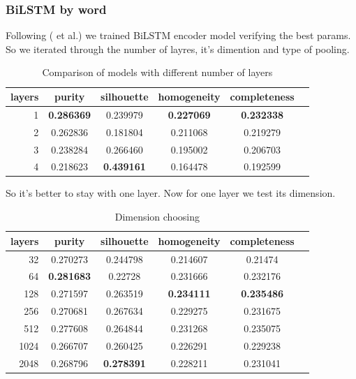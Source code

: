 \documentclass[11pt]{article}
\begin{document}
\subsubsection{BiLSTM by word}

Following ( et al.) we trained BiLSTM encoder model verifying the best params. So we iterated through the number of layres, it's dimention and type of pooling.

\begin{table}[htb]
\begin{center}
\begin{tabular}{ |r|c|c|c|c|c| }
\hline
layers & purity  & silhouette  & homogeneity  & completeness \\ \hline 
1  & \textbf{0.286369}  & 0.239979  & \textbf{0.227069}  & \textbf{0.232338}\\ \hline 
2  & 0.262836  & 0.181804  & 0.211068  & 0.219279\\ \hline 
3  & 0.238284  & 0.266460  & 0.195002  & 0.206703\\ \hline 
4  & 0.218623  & \textbf{0.439161}  & 0.164478  & 0.192599
\end{tabular}
\end{center}
\caption{Comparison of models with different number of layers}
\end{table}
\FloatBarrier

So it's better to stay with one layer. Now for one layer we test its dimension.

\begin{table}[htb]
\begin{center}
\begin{tabular}{ |r|c|c|c|c|c| }
\hline
layers & purity  & silhouette  & homogeneity  & completeness \\ \hline 
32  & 0.270273  & 0.244798  & 0.214607  & 0.21474\\ \hline 
64  & \textbf{0.281683}  & 0.22728  & 0.231666  & 0.232176\\ \hline 
128  & 0.271597  & 0.263519  & \textbf{0.234111}  & \textbf{0.235486}\\ \hline 
256  & 0.270681  & 0.267634  & 0.229275  & 0.231675\\ \hline 
512  & 0.277608  & 0.264844  & 0.231268  & 0.235075\\ \hline 
1024  & 0.266707  & 0.260425  & 0.226291  & 0.229238\\ \hline 
2048  & 0.268796  & \textbf{0.278391}  & 0.228211  & 0.231041 \\ \hline
\end{tabular}
\end{center}
\caption{Dimension choosing}
\end{table}
\FloatBarrier
\end{document}
